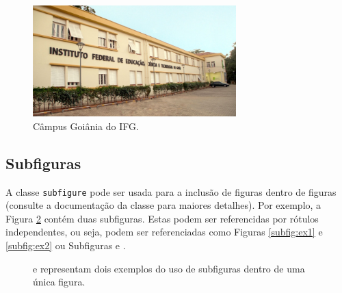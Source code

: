 \begin{figure}[H]
 \centering
  \includegraphics[width=0.70\textwidth]{./fig/foto-ifg}
  \caption{Câmpus Goiânia do IFG.}
 \label{fig:exemploFig3}
\end{figure}

\subsection{Subfiguras}
\label{subsec:subfigs} 
A classe \verb|subfigure| pode ser usada para a inclusão de figuras dentro de figuras (consulte a documentação da classe para maiores detalhes). Por exemplo, a Figura \ref{fig:subfiguras} contém duas subfiguras. Estas podem ser referencidas por rótulos independentes, ou seja, podem ser referenciadas como Figuras \ref{subfig:ex1} e \ref{subfig:ex2} ou Subfiguras  e .
\begin{figure}[h]
 \centering
   \qquad
   \caption{{} e {} representam dois exemplos do uso de subfiguras dentro de uma única figura.}
  \label{fig:subfiguras}
\end{figure}

